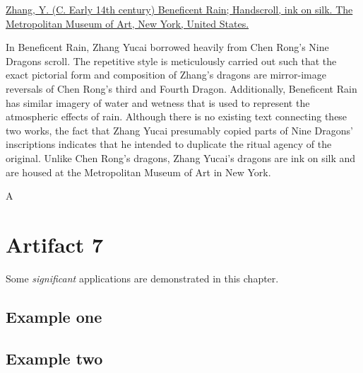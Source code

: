 \documentclass[
]{book}
\begin{document}
\href{https://www.metmuseum.org/art/collection/search/40454}{Zhang, Y. (C. Early 14th century) Beneficent Rain; Handscroll, ink on silk. The Metropolitan Museum of Art, New York, United States.}

In Beneficent Rain, Zhang Yucai borrowed heavily from Chen Rong's Nine Dragons scroll. The repetitive style is meticulously carried out such that the exact pictorial form and composition of Zhang's dragons are mirror-image reversals of Chen Rong's third and Fourth Dragon. Additionally, Beneficent Rain has similar imagery of water and wetness that is used to represent the atmospheric effects of rain. Although there is no existing text connecting these two works, the fact that Zhang Yucai presumably copied parts of Nine Dragons' inscriptions indicates that he intended to duplicate the ritual agency of the original. Unlike Chen Rong's dragons, Zhang Yucai's dragons are ink on silk and are housed at the Metropolitan Museum of Art in New York.

A

\hypertarget{artifact7}{%
\chapter*{Artifact 7}\label{artifact7}}

Some \emph{significant} applications are demonstrated in this chapter.

\hypertarget{example-one}{%
\section{Example one}\label{example-one}}

\hypertarget{example-two}{%
\section{Example two}\label{example-two}}

  
\end{document}
